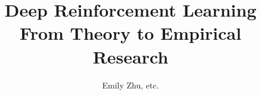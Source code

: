 \documentclass[graybox,envcountchap,sectrefs]{svmono}
\begin{document}
\author{Emily Zhu, etc.}
\title{Deep Reinforcement Learning \\  From Theory to Empirical Research}
\subtitle{}
\maketitle

\frontmatter%

%
%

%

\tableofcontents




\mainmatter%
%
  
 
 
 
 
 
 
% 

%

\backmatter%

%
\printindex

\end{document}
